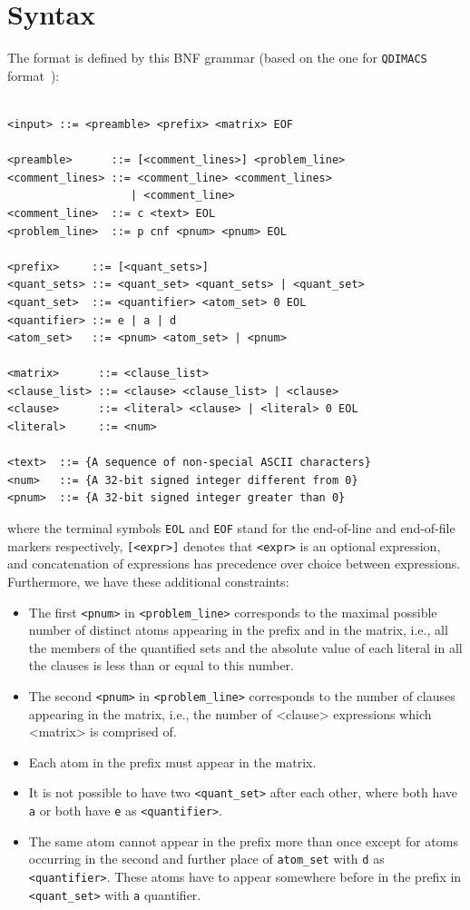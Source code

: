 \documentclass[
  digital, %
  color,
  twoside, %
  table,   %
  nolof,     %
  nolot,     %
]{fithesis3}
\theoremstyle{definition}
\theoremstyle{remark}
\begin{document}
\section{Syntax}
The format is defined by this BNF grammar (based on the one for \texttt{QDIMACS} format~\cite{QDIMACS}):
\begin{verbatim}

<input> ::= <preamble> <prefix> <matrix> EOF

<preamble>      ::= [<comment_lines>] <problem_line>
<comment_lines> ::= <comment_line> <comment_lines> 
                   | <comment_line> 
<comment_line>  ::= c <text> EOL
<problem_line>  ::= p cnf <pnum> <pnum> EOL

<prefix>     ::= [<quant_sets>]
<quant_sets> ::= <quant_set> <quant_sets> | <quant_set>
<quant_set>  ::= <quantifier> <atom_set> 0 EOL
<quantifier> ::= e | a | d
<atom_set>   ::= <pnum> <atom_set> | <pnum>

<matrix>      ::= <clause_list>
<clause_list> ::= <clause> <clause_list> | <clause> 
<clause>      ::= <literal> <clause> | <literal> 0 EOL
<literal>     ::= <num>

<text>  ::= {A sequence of non-special ASCII characters}
<num>   ::= {A 32-bit signed integer different from 0}
<pnum>  ::= {A 32-bit signed integer greater than 0}

\end{verbatim}
where the terminal symbols \verb|EOL| and \verb|EOF| stand for the end-of-line and end-of-file markers respectively, \verb|[<expr>]| denotes that \verb|<expr>| is an optional expression, and concatenation of expressions has precedence over choice between expressions. Furthermore, we have these additional constraints:
\begin{itemize}
    \item The first \verb|<pnum>| in \verb|<problem_line>| corresponds to the maximal possible number of distinct atoms appearing in the prefix and in the matrix, i.e., all the members of the quantified sets and the absolute value of each literal in all the clauses is less than or equal to this number.
    \item \begin{sloppypar} The second \verb|<pnum>| in \verb|<problem_line>| corresponds to the number of clauses appearing in the matrix, i.e., the number of <clause> expressions which <matrix> is comprised of. \end{sloppypar}
    \item Each atom in the prefix must appear in the matrix.
    \item It is not possible to have two \verb|<quant_set>| after each other, where both have \verb|a| or both have \verb|e| as \verb|<quantifier>|.
    \item The same atom cannot appear in the prefix more than once except for atoms occurring in the second and further place of \verb|atom_set| with \verb|d| as \verb|<quantifier>|. These atoms have to appear somewhere before in the prefix in \verb|<quant_set>| with \verb|a| quantifier.
\end{itemize}
\end{document}
